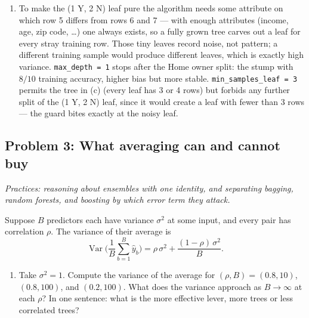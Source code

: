 \documentclass[
  11pt,
]{article}
\providecommand{\tightlist}{%
  \setlength{\itemsep}{0pt}\setlength{\parskip}{0pt}}
\newcommand{\answerpage}{\clearpage}
\begin{document}
\begin{solutionbox}
\begin{enumerate}
  Home owner = N and Married = N \(\to\) predict Y; Home owner = N and
  Married = Y \(\to\) (1 Y, 2 N) majority N. Training accuracy: only row
  5 is misclassified, so \(9/10 = 90\%\) (the depth-1 stump gets
  \(8/10\)).
\item
  To make the (1 Y, 2 N) leaf pure the algorithm needs some attribute on
  which row 5 differs from rows 6 and 7 --- with enough attributes
  (income, age, zip code, \ldots) one always exists, so a fully grown
  tree carves out a leaf for every stray training row. Those tiny leaves
  record noise, not pattern; a different training sample would produce
  different leaves, which is exactly high variance.
  \texttt{max\_depth\ =\ 1} stops after the Home owner split: the stump
  with \(8/10\) training accuracy, higher bias but more stable.
  \texttt{min\_samples\_leaf\ =\ 3} permits the tree in (c) (every leaf
  has 3 or 4 rows) but forbids any further split of the (1 Y, 2 N) leaf,
  since it would create a leaf with fewer than 3 rows --- the guard
  bites exactly at the noisy leaf.
\end{enumerate}

\end{solutionbox}

\answerpage

\subsection{Problem 3: What averaging can and cannot
buy}\label{problem-3-what-averaging-can-and-cannot-buy}

\emph{Practices: reasoning about ensembles with one identity, and
separating bagging, random forests, and boosting by which error term
they attack.}

Suppose \(B\) predictors each have variance \(\sigma^2\) at some input,
and every pair has correlation \(\rho\). The variance of their average
is
\[\operatorname{Var}\!\Big(\frac{1}{B}\sum_{b=1}^{B}\hat y_b\Big) = \rho\,\sigma^2 + \frac{(1-\rho)\,\sigma^2}{B}.\]

\begin{enumerate}
\def\labelenumi{(\alph{enumi})}
\tightlist
\item
  Take \(\sigma^2 = 1\). Compute the variance of the average for
  \((\rho, B) = (0.8, 10)\), \((0.8, 100)\), and \((0.2, 100)\). What
  does the variance approach as \(B \to \infty\) at each \(\rho\)? In
  one sentence: what is the more effective lever, more trees or less
  correlated trees?
\end{enumerate}
\end{document}

